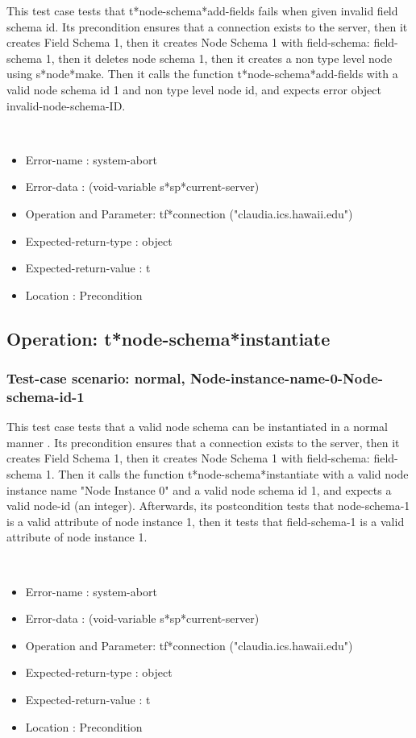 This test case tests that t*node-schema*add-fields fails when given invalid field schema id.
Its precondition ensures that a connection exists to the server, then it creates Field Schema 1, then it creates Node Schema 1 with field-schema: field-schema 1, then it deletes node schema 1, then it creates a non type level node using s*node*make.
Then it calls the function t*node-schema*add-fields  with a valid node schema id 1 and non type level node id, and expects error object invalid-node-schema-ID.



\
\begin {itemize}
\item 	Error-name             : system-abort
\item Error-data             : (void-variable s*sp*current-server)
\item Operation and Parameter: tf*connection ("claudia.ics.hawaii.edu")
\item Expected-return-type   : object
\item Expected-return-value  : t
\item Location               : Precondition



\end {itemize}
\subsection {Operation: t*node-schema*instantiate}
\subsubsection {Test-case scenario: normal, Node-instance-name-0-Node-schema-id-1}


This test case tests that a valid node schema can be instantiated in a normal manner .
Its precondition ensures that a connection exists to the server, then it creates Field Schema 1, then it creates Node Schema 1 with field-schema: field-schema 1.
Then it calls the function t*node-schema*instantiate  with a valid node instance name "Node Instance 0" and a valid node schema id 1, and expects a valid node-id (an integer).
Afterwards, its postcondition tests that node-schema-1 is a valid attribute of node instance 1, then it tests that field-schema-1 is a valid attribute of node instance 1.


\
\begin {itemize}
\item 	Error-name             : system-abort
\item Error-data             : (void-variable s*sp*current-server)
\item Operation and Parameter: tf*connection ("claudia.ics.hawaii.edu")
\item Expected-return-type   : object
\item Expected-return-value  : t
\item Location               : Precondition



\end {itemize}
